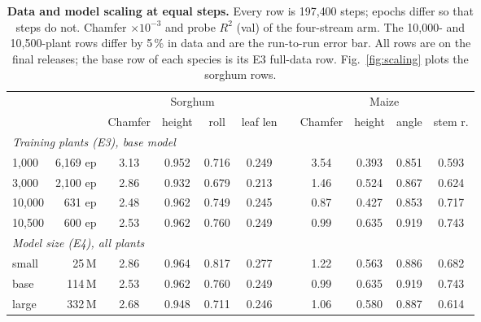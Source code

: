 \begin{table}[t]
  \centering\scriptsize
  \setlength{\tabcolsep}{3.0pt}
  \begin{tabular}{l r c ccc c c ccc}
    \toprule
    & & \multicolumn{4}{c}{Sorghum} & & \multicolumn{4}{c}{Maize} \\
    \cmidrule(lr){3-6}\cmidrule(lr){8-11}
    & & Chamfer & height & roll & leaf len & & Chamfer & height & angle & stem r. \\
    \midrule
    \multicolumn{11}{l}{\emph{Training plants (E3), base model}} \\
    1{,}000  & 6{,}169 ep & 3.13 & 0.952 & 0.716 & 0.249 & & 3.54 & 0.393 & 0.851 & 0.593 \\
    3{,}000  & 2{,}100 ep & 2.86 & 0.932 & 0.679 & 0.213 & & 1.46 & 0.524 & 0.867 & 0.624 \\
    10{,}000 & 631 ep     & 2.48 & 0.962 & 0.749 & 0.245 & & 0.87 & 0.427 & 0.853 & 0.717 \\
    10{,}500 & 600 ep     & 2.53 & 0.962 & 0.760 & 0.249 & & 0.99 & 0.635 & 0.919 & 0.743 \\
    \midrule
    \multicolumn{11}{l}{\emph{Model size (E4), all plants}} \\
    small  & 25\,M  & 2.86 & 0.964 & 0.817 & 0.277 & & 1.22 & 0.563 & 0.886 & 0.682 \\
    base   & 114\,M & 2.53 & 0.962 & 0.760 & 0.249 & & 0.99 & 0.635 & 0.919 & 0.743 \\
    large  & 332\,M & 2.68 & 0.948 & 0.711 & 0.246 & & 1.06 & 0.580 & 0.887 & 0.614 \\
    \bottomrule
  \end{tabular}
  \caption{\textbf{Data and model scaling at equal steps.} Every row is
  197{,}400 steps; epochs differ so that steps do not. Chamfer $\times10^{-3}$
  and probe $R^2$ (val) of the four-stream arm. The 10{,}000- and
  10{,}500-plant rows differ by 5\,\% in data and are the run-to-run error bar.
  All rows are on the final releases; the base row of each species is its E3
  full-data row. Fig.~\ref{fig:scaling} plots the
  sorghum rows.}
  \label{tab:scaling}
\end{table}

